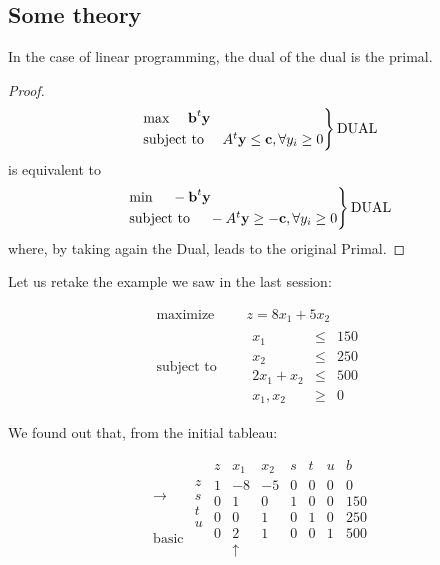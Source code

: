\subsection{Some theory}

\begin{theorem}
  In the case of linear programming, the dual of the dual is the primal.
\end{theorem}
\begin{proof}
 \[
\begin{rcases}
\text{max }\quad\textbf{b}^t \textbf{y}\\
\text{subject to }\quad A^t\textbf{y}\leq \textbf{c}, \forall y_i\geq0
\end{rcases} \text{DUAL}
\]
is equivalent to
\[
\begin{rcases}
\text{min }\quad-\textbf{b}^t \textbf{y}\\
\text{subject to }\quad -A^t\textbf{y}\geq -\textbf{c}, \forall y_i\geq0
\end{rcases} \text{DUAL}
\]
where, by taking again the Dual, leads to the original Primal.
\end{proof}

  Let us retake the example we saw in the last session:

  \begin{equation*}
    \begin{aligned}
      \text{maximize } \quad & z = 8x_1+5x_2 \\
      \text{subject to }\quad &
      \begin{array}{rcl}
        x_1 &\leq &150 \\
        x_2 &\leq &250 \\
        2x_1+x_2 &\leq &500 \\
        x_1,x_2 &\geq& 0
      \end{array}
    \end{aligned}
  \end{equation*}

  We found out that, from the initial tableau:

\begin{equation*}
\begin{array}{cc}
&\\
&z \\
\rightarrow &s \\
&t \\
&u\\
\mathrm{basic}
\end{array}
%
\begin{array}{c|ccccc|c}
  z & x_1 & x_2 & s & t & u & b \\ \hline
  1 & -8 & -5 & 0 & 0 & 0 & 0 \\ \hline
  0 & 1 & 0 & 1 & 0 & 0 & 150  \\
  0 & 0 & 1 & 0 & 1 & 0 & 250 \\
  0 & 2 & 1 & 0 & 0 & 1 & 500 \\
    & \uparrow & & & & &
\end{array}
\end{equation*}

